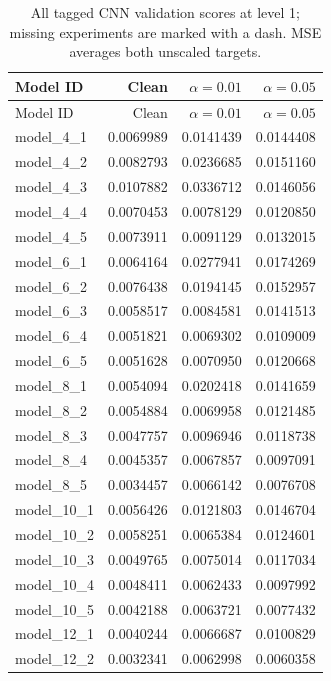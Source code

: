 \begingroup\footnotesize\setlength{\tabcolsep}{3pt}\renewcommand{\arraystretch}{1.05}
\begin{longtable}{lrrr}
\caption{All tagged CNN validation scores at level 1; missing experiments are marked with a dash. MSE averages both unscaled targets.}\label{tab:cnn1}\\
\toprule
Model ID & Clean & $\alpha=0.01$ & $\alpha=0.05$ \\
\midrule
\endfirsthead
\toprule
Model ID & Clean & $\alpha=0.01$ & $\alpha=0.05$ \\
\midrule\endhead
\bottomrule\endfoot
model\_4\_1 & 0.0069989 & 0.0141439 & 0.0144408 \\
model\_4\_2 & 0.0082793 & 0.0236685 & 0.0151160 \\
model\_4\_3 & 0.0107882 & 0.0336712 & 0.0146056 \\
model\_4\_4 & 0.0070453 & 0.0078129 & 0.0120850 \\
model\_4\_5 & 0.0073911 & 0.0091129 & 0.0132015 \\
model\_6\_1 & 0.0064164 & 0.0277941 & 0.0174269 \\
model\_6\_2 & 0.0076438 & 0.0194145 & 0.0152957 \\
model\_6\_3 & 0.0058517 & 0.0084581 & 0.0141513 \\
model\_6\_4 & 0.0051821 & 0.0069302 & 0.0109009 \\
model\_6\_5 & 0.0051628 & 0.0070950 & 0.0120668 \\
model\_8\_1 & 0.0054094 & 0.0202418 & 0.0141659 \\
model\_8\_2 & 0.0054884 & 0.0069958 & 0.0121485 \\
model\_8\_3 & 0.0047757 & 0.0096946 & 0.0118738 \\
model\_8\_4 & 0.0045357 & 0.0067857 & 0.0097091 \\
model\_8\_5 & 0.0034457 & 0.0066142 & 0.0076708 \\
model\_10\_1 & 0.0056426 & 0.0121803 & 0.0146704 \\
model\_10\_2 & 0.0058251 & 0.0065384 & 0.0124601 \\
model\_10\_3 & 0.0049765 & 0.0075014 & 0.0117034 \\
model\_10\_4 & 0.0048411 & 0.0062433 & 0.0097992 \\
model\_10\_5 & 0.0042188 & 0.0063721 & 0.0077432 \\
model\_12\_1 & 0.0040244 & 0.0066687 & 0.0100829 \\
model\_12\_2 & 0.0032341 & 0.0062998 & 0.0060358 \\

\end{longtable}
